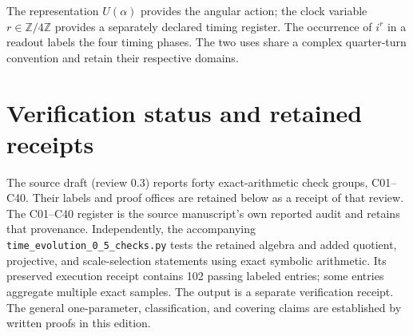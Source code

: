 \documentclass[10pt,letterpaper]{article}
\theoremstyle{definition}\newtheorem{definition}[theorem]{Definition}
\newcommand{\ZZ}{\mathbb Z}
\begin{document}
The representation $U(\alpha)$ provides the angular action; the clock variable $r\in\ZZ/4\ZZ$ provides a separately declared timing register. The occurrence of $i^r$ in a readout labels the four timing phases. The two uses share a complex quarter-turn convention and retain their respective domains.

\section{Verification status and retained receipts}
The source draft (review 0.3) reports forty exact-arithmetic check groups, C01--C40. Their labels and proof offices are retained below as a receipt of that review. The C01--C40 register is the source manuscript's own reported audit and retains that provenance. Independently, the accompanying \texttt{time\_evolution\_0\_5\_checks.py} tests the retained algebra and added quotient, projective, and scale-selection statements using exact symbolic arithmetic. Its preserved execution receipt contains 102 passing labeled entries; some entries aggregate multiple exact samples. The output is a separate verification receipt. The general one-parameter, classification, and covering claims are established by written proofs in this edition.
\end{document}
